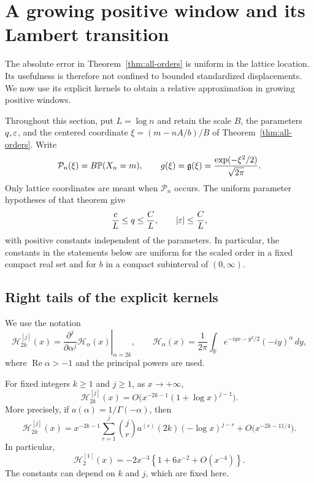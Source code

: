 \section{A growing positive window and its Lambert transition}
\label{sec:positive-wing}

The absolute error in Theorem~\ref{thm:all-orders} is uniform in the
lattice location.  Its usefulness is therefore not confined to bounded
standardized displacements.  We now use its explicit kernels to obtain
a relative approximation in growing positive windows.

Throughout this section, put $L=\log n$ and retain the scale $B$, the
parameters $q,\varepsilon$, and the centered coordinate
$\xi=(m-nA/b)/B$ of Theorem~\ref{thm:all-orders}.  Write
\[
 \mathcal P_n(\xi)=B\mathbb P(X_n=m),\qquad
 g(\xi)=\mathfrak g(\xi)=\frac{\exp(-\xi^2/2)}{\sqrt{2\pi}}.
\]
Only lattice coordinates are meant when $\mathcal P_n$ occurs.  The
uniform parameter hypotheses of that theorem give
\begin{equation}\label{wing:small-parameters}
 \frac{c}{L}\le q\le\frac{C}{L},\qquad
 |\varepsilon|\le\frac{C}{L},
\end{equation}
with positive constants independent of the parameters.  In particular,
the constants in the statements below are uniform for the scaled order
in a fixed compact real set and for $b$ in a compact subinterval of
$(0,\infty)$.

\subsection{Right tails of the explicit kernels}

We use the notation
\[
 \mathcal H_{2k}^{[j]}(x)
 =\left.\frac{\partial^j}{\partial\alpha^j}
             \mathcal H_\alpha(x)\right|_{\alpha=2k},\qquad
 \mathcal H_\alpha(x)=\frac1{2\pi}
       \int_{\mathbb R}e^{-iyx-y^2/2}(-iy)^\alpha\,dy,
\]
where $\operatorname{Re}\alpha>-1$ and the principal powers are used.

\begin{samepage}
\begin{lemma}\label{lem:kernel-wing}
For fixed integers $k\ge1$ and $j\ge1$, as $x\to+\infty$,
\begin{equation}\label{wing:derivative-bound}
 \mathcal H_{2k}^{[j]}(x)
 =O\bigl(x^{-2k-1}(1+\log x)^{j-1}\bigr).
\end{equation}
More precisely, if $a(\alpha)=1/\Gamma(-\alpha)$, then
\begin{equation}\label{wing:leading-polynomial}
 \mathcal H_{2k}^{[j]}(x)
 =x^{-2k-1}\sum_{r=1}^j\binom jr
        a^{(r)}(2k)(-\log x)^{j-r}
       +O\bigl(x^{-2k-11/4}\bigr).
\end{equation}
In particular,
\begin{equation}\label{wing:first-kernel-tail}
 \mathcal H_2^{[1]}(x)
 =-2x^{-3}\left\{1+6x^{-2}+O(x^{-4})\right\}.
\end{equation}
The constants can depend on $k$ and $j$, which are fixed here.
\end{lemma}
\end{samepage}

